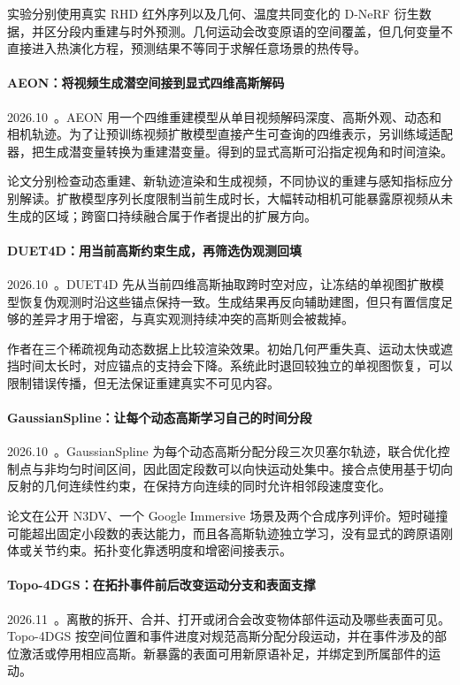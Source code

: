 实验分别使用真实 RHD 红外序列以及几何、温度共同变化的 D-NeRF 衍生数据，并区分段内重建与时外预测。几何运动会改变原语的空间覆盖，但几何变量不直接进入热演化方程，预测结果不等同于求解任意场景的热传导。

\paragraph{AEON：将视频生成潜空间接到显式四维高斯解码}
2026.10~\cite{2610_28631}。AEON 用一个四维重建模型从单目视频解码深度、高斯外观、动态和相机轨迹。为了让预训练视频扩散模型直接产生可查询的四维表示，另训练域适配器，把生成潜变量转换为重建潜变量。得到的显式高斯可沿指定视角和时间渲染。

论文分别检查动态重建、新轨迹渲染和生成视频，不同协议的重建与感知指标应分别解读。扩散模型序列长度限制当前生成时长，大幅转动相机可能暴露原视频从未生成的区域；跨窗口持续融合属于作者提出的扩展方向。

\paragraph{DUET4D：用当前高斯约束生成，再筛选伪观测回填}
2026.10~\cite{2610_35002}。DUET4D 先从当前四维高斯抽取跨时空对应，让冻结的单视图扩散模型恢复伪观测时沿这些锚点保持一致。生成结果再反向辅助建图，但只有置信度足够的差异才用于增密，与真实观测持续冲突的高斯则会被裁掉。

作者在三个稀疏视角动态数据上比较渲染效果。初始几何严重失真、运动太快或遮挡时间太长时，对应锚点的支持会下降。系统此时退回较独立的单视图恢复，可以限制错误传播，但无法保证重建真实不可见内容。

\paragraph{GaussianSpline：让每个动态高斯学习自己的时间分段}
2026.10~\cite{2610_35224}。GaussianSpline 为每个动态高斯分配分段三次贝塞尔轨迹，联合优化控制点与非均匀时间区间，因此固定段数可以向快运动处集中。接合点使用基于切向反射的几何连续性约束，在保持方向连续的同时允许相邻段速度变化。

论文在公开 N3DV、一个 Google Immersive 场景及两个合成序列评价。短时碰撞可能超出固定小段数的表达能力，而且各高斯轨迹独立学习，没有显式的跨原语刚体或关节约束。拓扑变化靠透明度和增密间接表示。

\paragraph{Topo-4DGS：在拓扑事件前后改变运动分支和表面支撑}
2026.11~\cite{2611_16012}。离散的拆开、合并、打开或闭合会改变物体部件运动及哪些表面可见。Topo-4DGS 按空间位置和事件进度对规范高斯分配分段运动，并在事件涉及的部位激活或停用相应高斯。新暴露的表面可用新原语补足，并绑定到所属部件的运动。

